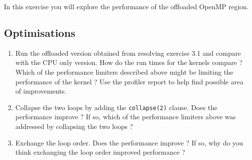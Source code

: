 \documentclass{article}
\begin{document}
In this exercise you will explore the performance of the offloaded OpenMP region.

\subsection{ Optimisations}
\begin{enumerate}
    \item Run the offloaded version obtained from resolving exercise 3.1 and compare with the CPU only version. How do the run times for the kernels compare ? Which of the performance limiters described above might be limiting the performance of the kernel ? Use the profiler report to help find possible area of improvements.
    \item Collapse the two loops by adding the \texttt{collapse(2)} clause. Does the performance improve ? If so, which of the performance limiters above  was addressed by collapsing the two loops ?
    \item Exchange the loop order. Does the performance improve ? If so, why do you think exchanging the loop order improved performance ?
\end{enumerate}
\end{document}
